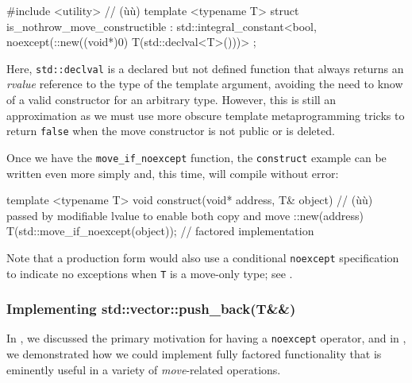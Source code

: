 \begin{emcppslisting}
#include <utility>  // (ù{}ù)
template <typename T>
struct is_nothrow_move_constructible
    : std::integral_constant<bool,
                             noexcept(::new((void*)0) T(std::declval<T>()))>
{
};
\end{emcppslisting}
    

\noindent Here, \lstinline!std::declval! is a declared but not defined function that
always returns an \emph{rvalue} reference to the type of the template
argument, avoiding the need to know of a valid constructor for an
arbitrary type. However, this is still an approximation as we must use
more obscure template metaprogramming tricks to return \lstinline!false!
when the move constructor is not public or is deleted.

Once we have the \lstinline!move_if_noexcept! function, the
\lstinline!construct! example can be written even more simply and, this
time, will compile without error:

\begin{emcppslisting}
template <typename T>
void construct(void* address, T& object)
     // (ù{}ù) passed by modifiable lvalue to enable both copy and move
{
    ::new(address) T(std::move_if_noexcept(object));  // factored implementation
}
\end{emcppslisting}
    

\noindent Note that a production form would also use a conditional
\lstinline!noexcept! specification to indicate no exceptions when
\lstinline!T! is a move-only type; see .

\subsubsection[Implementing \lstinline!std::vector::push_back(T&&)!]{Implementing {\SubsubsecCode std::vector::push\_back(T\&\&)}}\label{implementing-std::vector::push_back(t&&)}

In , we discussed the primary motivation for having
a \lstinline!noexcept! operator, and in , we demonstrated how we could
implement fully factored functionality that is eminently useful in a
variety of \emph{move}-related operations.

